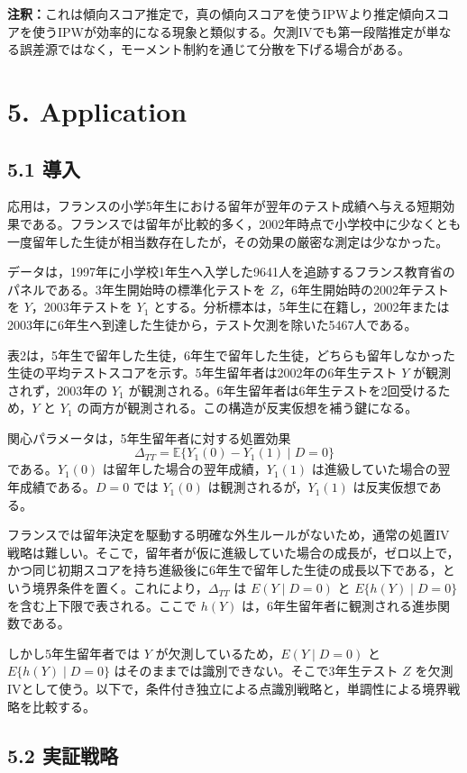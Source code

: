 \documentclass[10pt,a4paper]{article}
\newcommand{\E}{\mathbb{E}}
\newcommand{\note}[1]{\par\smallskip\noindent\textbf{注釈：}#1\par\smallskip}
\begin{document}
\note{これは傾向スコア推定で，真の傾向スコアを使うIPWより推定傾向スコアを使うIPWが効率的になる現象と類似する。欠測IVでも第一段階推定が単なる誤差源ではなく，モーメント制約を通じて分散を下げる場合がある。}

\section{5. Application}

\subsection{5.1 導入}

応用は，フランスの小学5年生における留年が翌年のテスト成績へ与える短期効果である。フランスでは留年が比較的多く，2002年時点で小学校中に少なくとも一度留年した生徒が相当数存在したが，その効果の厳密な測定は少なかった。

データは，1997年に小学校1年生へ入学した9641人を追跡するフランス教育省のパネルである。3年生開始時の標準化テストを $Z$，6年生開始時の2002年テストを $Y$，2003年テストを $Y_1$ とする。分析標本は，5年生に在籍し，2002年または2003年に6年生へ到達した生徒から，テスト欠測を除いた5467人である。

表2は，5年生で留年した生徒，6年生で留年した生徒，どちらも留年しなかった生徒の平均テストスコアを示す。5年生留年者は2002年の6年生テスト $Y$ が観測されず，2003年の $Y_1$ が観測される。6年生留年者は6年生テストを2回受けるため，$Y$ と $Y_1$ の両方が観測される。この構造が反実仮想を補う鍵になる。

関心パラメータは，5年生留年者に対する処置効果
\[
\Delta_{TT}=\E\{Y_1(0)-Y_1(1)\mid D=0\}
\]
である。$Y_1(0)$ は留年した場合の翌年成績，$Y_1(1)$ は進級していた場合の翌年成績である。$D=0$ では $Y_1(0)$ は観測されるが，$Y_1(1)$ は反実仮想である。

フランスでは留年決定を駆動する明確な外生ルールがないため，通常の処置IV戦略は難しい。そこで，留年者が仮に進級していた場合の成長が，ゼロ以上で，かつ同じ初期スコアを持ち進級後に6年生で留年した生徒の成長以下である，という境界条件を置く。これにより，$\Delta_{TT}$ は $E(Y\mid D=0)$ と $E\{h(Y)\mid D=0\}$ を含む上下限で表される。ここで $h(Y)$ は，6年生留年者に観測される進歩関数である。

しかし5年生留年者では $Y$ が欠測しているため，$E(Y\mid D=0)$ と $E\{h(Y)\mid D=0\}$ はそのままでは識別できない。そこで3年生テスト $Z$ を欠測IVとして使う。以下で，条件付き独立による点識別戦略と，単調性による境界戦略を比較する。

\subsection{5.2 実証戦略}
\end{document}
